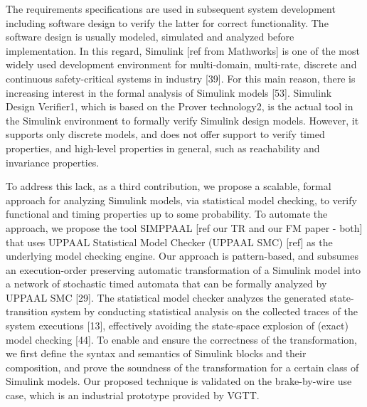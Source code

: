 The requirements specifications are used in subsequent system development including software design to verify the latter for correct functionality. The software design is usually modeled, simulated and analyzed before implementation.
In this regard, Simulink [ref from Mathworks] is one of the most widely used development environment for multi-domain, multi-rate, discrete and continuous safety-critical systems in industry [39]. For this main reason, there is increasing
interest in the formal analysis of Simulink models [53]. Simulink Design Verifier1, which is based on the Prover technology2, is the actual tool in the Simulink environment to formally verify Simulink design models. However, it supports only discrete models, and does not offer support to verify timed properties, and high-level properties in general, such as reachability and invariance properties.
 
To address this lack, as a third contribution, we propose a scalable, formal approach for analyzing Simulink models, via statistical model checking, to verify functional and timing properties up to some probability. To automate the approach, we propose the tool SIMPPAAL [ref our TR and our FM paper - both] that uses UPPAAL Statistical Model Checker (UPPAAL SMC) [ref] as the underlying model checking engine. Our approach is pattern-based, and subsumes an execution-order preserving automatic transformation of a Simulink model into a network of stochastic timed automata that can be formally analyzed by UPPAAL SMC [29]. The statistical model checker analyzes the generated state-transition system by conducting statistical analysis on the collected traces of the system executions [13], effectively avoiding the state-space explosion of (exact) model checking [44]. To enable and ensure the correctness of the transformation, we first define the syntax and semantics of Simulink blocks and their composition, and prove the soundness of the transformation for a certain class of Simulink models. Our proposed technique is validated on the brake-by-wire use case, which is an industrial prototype provided by VGTT.
 
